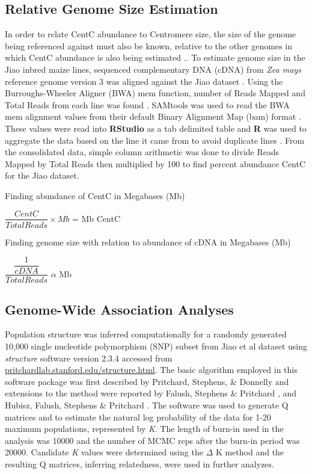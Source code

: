 \documentclass[12pt]{article}
\begin{document}

\subsection{Relative Genome Size Estimation } %

In order to relate CentC abundance to Centromere size, the size of the genome being referenced against must also be known, relative to the other genomes in which CentC abundance is also being estimated \cite{ncbi nucleotide database}.. To estimate genome size in the Jiao inbred maize lines, sequenced complementary DNA (cDNA) from \emph{Zea mays} reference genome version 3 was aligned against the Jiao dataset \cite{Jiao2012}. Using the Burroughs-Wheeler Aligner (BWA) mem function, number of Reads Mapped and Total Reads from each line was found \cite{BWA}. SAMtools was used to read the BWA mem alignment values from their default Binary Alignment Map (bam) format \cite{SAMtools}. These values were read into {\bf RStudio} as a tab delimited table and {\bf R} was used to aggregate the data based on the line it came from to avoid duplicate lines \cite{R} \cite{RStudio}. From the consolidated data, simple column arithmetic was done to divide Reads Mapped by Total Reads then multiplied by 100 to find percent abundance CentC for the Jiao dataset. 



Finding abundance of CentC in Megabases (Mb)

$\dfrac{CentC}{Total Reads}\times Mb$ = Mb CentC	

Finding genome size with relation to abundance of cDNA in Megabases (Mb)

$\dfrac{\dfrac{1}{cDNA}}{Total Reads}$ $\alpha$ Mb




\subsection{Genome-Wide Association Analyses} %
Population structure was inferred computationally for a randomly generated 10,000 single nucleotide polymorphism (SNP) subset from Jiao et al dataset \cite{Jiao2012} using \emph{structure} software version 2.3.4 accessed from \url{pritchardlab.stanford.edu/structure.html}.  The basic algorithm employed in this software package was first described by Pritchard, Stephens, \& Donnelly \cite{Pritchard2000} and extensions to the method were reported by Falush, Stephens \& Pritchard \cite{Falush2003}, \cite{Falush2007} and Hubisz, Falush, Stephens \& Pritchard \cite{Hubisz2009}.  The software was used to generate Q matrices and to estimate the natural log probability of the data for 1-20 maximum populations, represented by \emph{K}.  The length of burn-in used in the analysis was 10000 and the number of MCMC reps after the burn-in period was 20000.  Candidate \emph{K} values were determined using the $\Delta$ K method and the resulting Q matrices, inferring relatedness, were used in further analyzes.    
\end{document}
